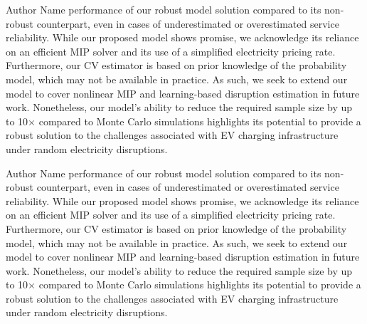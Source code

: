 \documentclass[preprint]{oscmjournal}
\theoremstyle{remark}
\begin{document}
\begin{biography}{Author Name}
performance of our robust model solution compared to its non-robust counterpart, even in cases of underestimated or overestimated service reliability. While our proposed model shows promise, we acknowledge its reliance on an efficient MIP solver and its use of a simplified electricity pricing rate. Furthermore, our CV estimator is based on prior knowledge of the probability model, which may not be available in practice. As such, we seek to extend our model to cover nonlinear MIP and learning-based disruption estimation in future work. Nonetheless, our model's ability to reduce the required sample size by up to 10$\times$ compared to Monte Carlo simulations highlights its potential to provide a robust solution to the challenges associated with EV charging infrastructure under random electricity disruptions.
\end{biography}

\begin{biography}{Author Name}
performance of our robust model solution compared to its non-robust counterpart, even in cases of underestimated or overestimated service reliability. While our proposed model shows promise, we acknowledge its reliance on an efficient MIP solver and its use of a simplified electricity pricing rate. Furthermore, our CV estimator is based on prior knowledge of the probability model, which may not be available in practice. As such, we seek to extend our model to cover nonlinear MIP and learning-based disruption estimation in future work. Nonetheless, our model's ability to reduce the required sample size by up to 10$\times$ compared to Monte Carlo simulations highlights its potential to provide a robust solution to the challenges associated with EV charging infrastructure under random electricity disruptions.
\end{biography}
\end{document}
